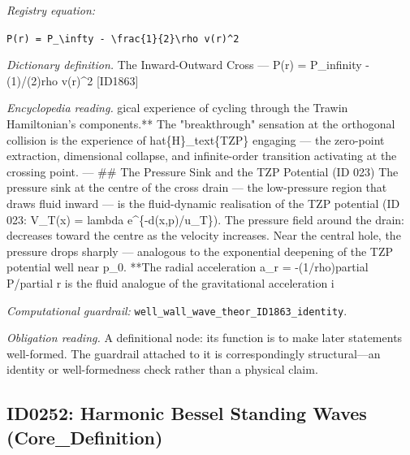 \documentclass[11pt]{article}
\theoremstyle{remark}
\begin{document}
\noindent\textit{Registry equation:}\par
{\small\texttt{P(r) = P\_\textbackslash{}infty - \textbackslash{}frac\{1\}\{2\}\textbackslash{}rho v(r)\textasciicircum{}2}}\par\medskip
\noindent\textit{Dictionary definition.} The Inward-Outward Cross --- P(r) = P\_infinity - (1)/(2)rho v(r)\textasciicircum{}2 [ID1863]\par\medskip
\noindent\textit{Encyclopedia reading.} gical experience of cycling through the Trawin Hamiltonian's components.** The "breakthrough" sensation at the orthogonal collision is the experience of hat\{H\}\_text\{TZP\} engaging --- the zero-point extraction, dimensional collapse, and infinite-order transition activating at the crossing point. --- \#\# The Pressure Sink and the TZP Potential (ID 023) The pressure sink at the centre of the cross drain --- the low-pressure region that draws fluid inward --- is the fluid-dynamic realisation of the TZP potential (ID 023: V\_T(x) = lambda e\textasciicircum{}\{-d(x,p)/u\_T\}). The pressure field around the drain: decreases toward the centre as the velocity increases. Near the central hole, the pressure drops sharply --- analogous to the exponential deepening of the TZP potential well near p\_0. **The radial acceleration a\_r = -(1/rho)partial P/partial r is the fluid analogue of the gravitational acceleration i
\par\medskip\noindent\textit{Computational guardrail:} \texttt{well\_wall\_wave\_theor\_ID1863\_identity}.
\par\medskip\noindent\textit{Obligation reading.} A definitional node: its function is to make later statements well-formed. The guardrail attached to it is correspondingly structural---an identity or well-formedness check rather than a physical claim.

\subsection{ID0252: Harmonic Bessel Standing Waves (Core\_Definition)}
\end{document}
